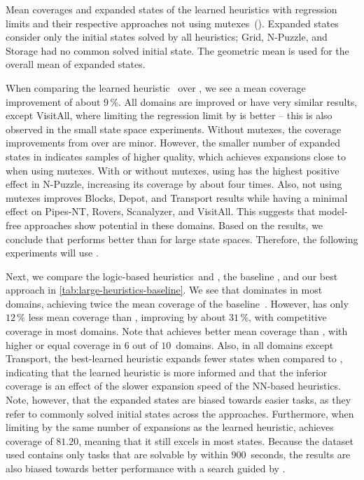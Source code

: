 \begin{table}[tb]
    \caption[Results of the learned heuristics with and without mutexes.]{Mean coverages and expanded states of the learned heuristics with regression limits and their respective approaches not using mutexes~(\hnnnomutex). Expanded states consider only the initial states solved by all heuristics; Grid, N-Puzzle, and Storage had no common solved initial state. The geometric mean is used for the overall mean of expanded states.}
    \label{tab:large-rolloutlimit-mutex}
    \addmargin
    \centering
    
\end{table}

When comparing the learned heuristic~\hnnl{\rlmeanfx} over \hnnl{\rlfacts}, we see a mean coverage improvement of about $9\,\%$. All domains are improved or have very similar results, except VisitAll, where limiting the regression limit by \rlfacts is better -- this is also observed in the small state space experiments. Without mutexes, the coverage improvements from \rlmeanfx over \rlfacts are minor. However, the smaller number of expanded states in \hnnnomutexl{\rlmeanfx} indicates samples of higher quality, which achieves expansions close to when using mutexes. With or without mutexes, using \rlmeanfx has the highest positive effect in N-Puzzle, increasing its coverage by about four times. Also, not using mutexes improves Blocks, Depot, and Transport results while having a minimal effect on Pipes-NT, Rovers, Scanalyzer, and VisitAll. This suggests that model-free approaches show potential in these domains. Based on the results, we conclude that \rlmeanfx performs better than \rlfacts for large state spaces. Therefore, the following experiments will use \rlmeanfx.

Next, we compare the logic-based heuristics~\hff and \hgc, the baseline \hnnbase, and our best approach \hnnrs in \cref{tab:large-heuristics-baseline}. We see that \hff dominates in most domains, achieving twice the mean coverage of the baseline~\hnnbase. However, \hnnrs has only $12\,\%$ less mean coverage than \hff, improving \hnnbase by about $31\,\%$, with competitive coverage in most domains. Note that \hnnrs achieves better mean coverage than \hgc, with higher or equal coverage in $6$ out of $10$~domains. Also, in all domains except Transport, the best-learned heuristic \hnnrs expands fewer states when compared to \hff, indicating that the learned heuristic is more informed and that the inferior coverage is an effect of the slower expansion speed of the NN-based heuristics. Note, however, that the expanded states are biased towards easier tasks, as they refer to commonly solved initial states across the approaches. Furthermore, when limiting \hff by the same number of expansions as the learned heuristic, \hff achieves coverage of $81.20$, meaning that it still excels in most states. Because the dataset used contains only tasks that are solvable by \hff within $900$~seconds, the results are also biased towards better performance with a search guided by \hff. 

